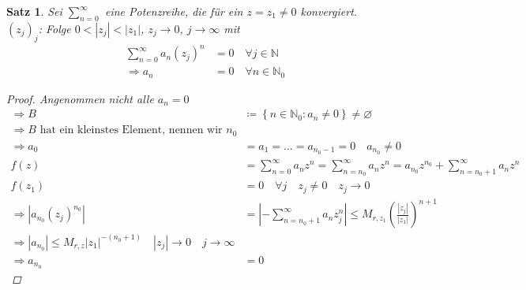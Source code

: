 \documentclass[11pt, twoside, a4paper]{article}
\theoremstyle{plain}
\newtheorem{satz}[blockelement]{Satz}
\newcommand{\set}[1]{\left\{#1\right\}}
\newcommand{\pair}[1]{\left(#1\right)}
\newcommand{\abs}[1]{\left|#1\right|}
\newcommand{\impl}[0]{\Rightarrow{}}
\newcommand{\definedas}[0]{\coloneqq}
\renewcommand{\emptyset}{\varnothing}
\newcommand{\fromto}{\rightarrow{}}
\newcommand{\N}{\mathbb{N}}
\begin{document}
    \begin{satz} %
        \marginnote{[18. Jan]}

        Sei $ \sum_{n=0}^{\infty}$ eine Potenzreihe, die für ein $z=z_1\neq 0$ konvergiert.\\
        $(z_j)_j$: Folge $0< \abs{z_j} < \abs{z_1}$, $z_j \fromto 0$, $j\fromto\infty$ mit
        \begin{align*}
            \sum_{n=0}^{\infty} a_n (z_j)^n &= 0\quad\forall j\in\N\\
            \impl a_n &= 0\quad\forall n\in\N_0
        \end{align*}
        \begin{proof}
            Angenommen nicht alle $a_n=0$
            \begin{align*}
                \impl B &\definedas \set{n\in\N_0: a_n \neq 0} \neq \emptyset\\
                \impl B \text{ hat ein kleinstes Element, nennen wir } n_0\\
                \impl a_0 &= a_1 = \dots = a_{n_0-1} = 0\quad a_{n_0}\neq 0\\
                f(z) &= \sum_{n=0}^{\infty} a_n z^n = \sum_{n=n_0}^{\infty} a_n z^n = a_{n_0} z^{n_0} + \sum_{n=n_0 + 1}^{\infty} a_n z^n\\
                f(z_1) &= 0\quad\forall j\quad z_j \neq 0\quad z_j\fromto 0\\
                \impl \abs{a_{n_0} (z_j)^{n_0}} &= \abs{- \sum_{n=n_0 + 1}^{\infty} a_n z_j^n} \leq M_{r, z_1} \pair{\frac{\abs{z_j}}{\abs{z_1}}}^{n+1}\\
                \impl \abs{a_{n_0}} \leq M_{r,z} \abs{z_1}^{-(n_0+1)}\quad \abs{z_j} \fromto 0\quad j\fromto\infty\\
                \impl a_{n_0} &= 0\tag{Widerspruch}
            \end{align*}
        \end{proof}
    \end{satz}
\end{document}
